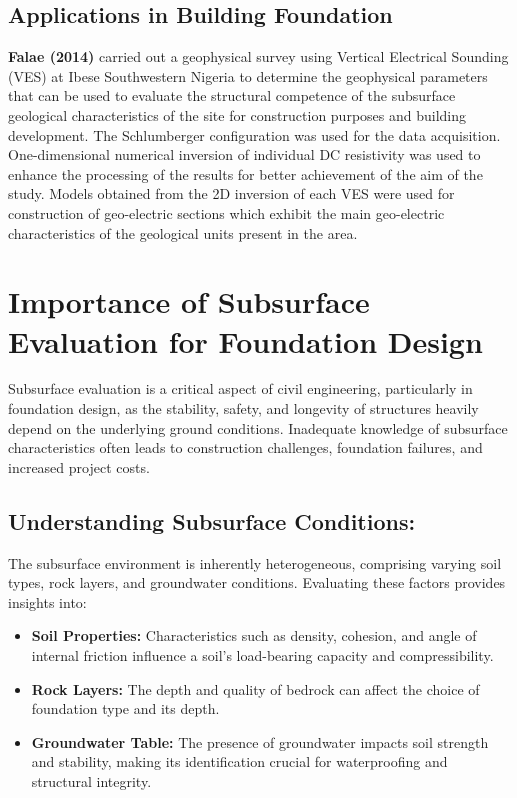 \documentclass[12pt,a4paper]{report}
\begin{document}
\subsection{Applications in Building Foundation}
\textbf{Falae (2014)} carried out a geophysical survey using Vertical Electrical Sounding (VES) at Ibese Southwestern Nigeria to determine the geophysical parameters that can be used to evaluate the structural competence of the subsurface geological characteristics of the site for construction purposes and building development. The Schlumberger configuration was used for the data acquisition. One-dimensional numerical inversion of individual DC resistivity was used to enhance the processing of the results for better achievement of the aim of the study. Models obtained from the 2D inversion of each VES were used for construction of geo-electric sections which exhibit the main geo-electric characteristics of the geological units present in the area. 

\section{Importance of Subsurface Evaluation for Foundation Design}

Subsurface evaluation is a critical aspect of civil engineering, particularly in foundation design, as the stability, safety, and longevity of structures heavily depend on the underlying ground conditions. Inadequate knowledge of subsurface characteristics often leads to construction challenges, foundation failures, and increased project costs.

\subsection{Understanding Subsurface Conditions:}
The subsurface environment is inherently heterogeneous, comprising varying soil types, rock layers, and groundwater conditions. Evaluating these factors provides insights into:

\begin{itemize}
    \item \textbf{Soil Properties:} Characteristics such as density, cohesion, and angle of internal friction influence a soil's load-bearing capacity and compressibility.
    \item \textbf{Rock Layers:} The depth and quality of bedrock can affect the choice of foundation type and its depth.
    \item \textbf{Groundwater Table:} The presence of groundwater impacts soil strength and stability, making its identification crucial for waterproofing and structural integrity.
\end{itemize}
\end{document}
